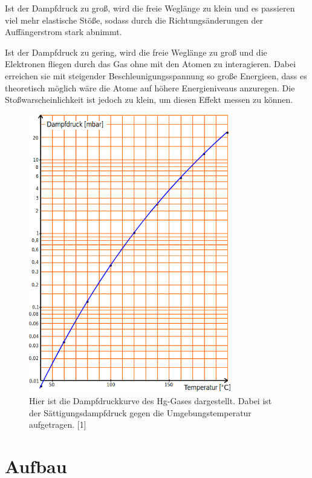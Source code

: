 \documentclass[titlepage = firstcover]{scrartcl}
\begin{document}
                Ist der Dampfdruck zu groß, wird die freie Weglänge zu klein und es passieren viel mehr elastische Stöße, sodass durch die Richtungsänderungen der Auffängerstrom stark abnimmt.

                Ist der Dampfdruck zu gering, wird die freie Weglänge zu groß und die Elektronen fliegen durch das Gas ohne mit den Atomen zu interagieren. Dabei erreichen sie mit steigender Beschleunigungsspannung so große Energieen, dass es theoretisch möglich wäre die Atome auf höhere Energieniveaus anzuregen. Die Stoßwarscheinlichkeit ist jedoch zu klein, um diesen Effekt messen zu können.

                \begin{figure}[h]
                    \centering
                    \includegraphics[width = 0.8\textwidth]{Bilder/Dampfdruckkurve.png}
                    \caption{Hier ist die Dampfdruckkurve des Hg-Gases dargestellt. Dabei ist der Sättigungsdampfdruck gegen die Umgebungstemperatur aufgetragen. [1]}
                    \label{fig:Dampfdruckkurve}
                \end{figure}

                \FloatBarrier
    
    \newpage
    \section{Aufbau}
\end{document}

